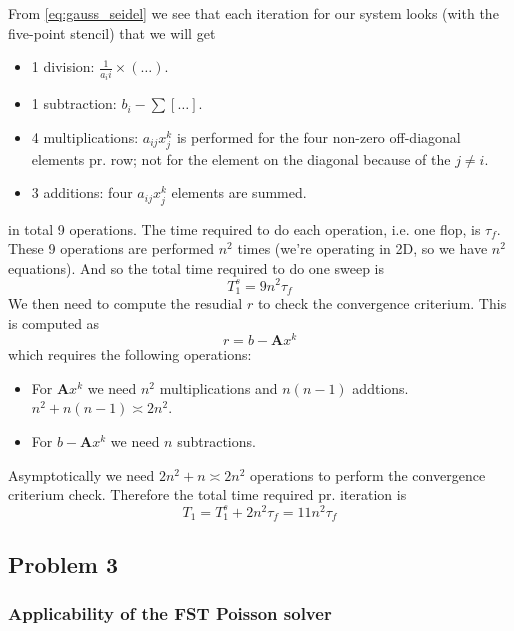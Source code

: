 From \eqref{eq:gauss_seidel} we see that each iteration for our system looks (with the five-point stencil) that we will get
\begin{itemize}
  \item 1 division: $\frac{1}{a_ii}\times(\dots)$.
  \item 1 subtraction: $b_i - \sum[\dots]$.
  \item 4 multiplications: $a_{ij}x_j^k$ is performed for the four non-zero off-diagonal elements pr. row; not for the element on the diagonal because of the $j\neq i$.
  \item 3 additions: four $a_{ij}x_j^k$ elements are summed.
\end{itemize}
in total 9 operations. The time required to do each operation, i.e. one flop, is $\tau_f$. These 9 operations are performed $n^2$ times (we're operating in 2D, so we have $n^2$ equations). And so the total time required to do one sweep is
\begin{equation}
  T_1^s = 9n^2\tau_f
\end{equation}
We then need to compute the resudial $r$ to check the convergence criterium. This is computed as
\begin{equation}
  r = b - \mathbf{A}x^k
\end{equation}
which requires the following operations:
\begin{itemize}
  \item For $\mathbf{A}x^k$ we need $n^2$ multiplications and $n(n-1)$ addtions. $n^2+n(n-1)\asymp 2n^2$.
  \item For $b - \mathbf{A}x^k$ we need $n$ subtractions.
\end{itemize}
Asymptotically we need $2n^2 + n \asymp 2n^2$ operations to perform the convergence criterium check. Therefore the total time required pr. iteration is
\begin{equation}
  T_1 = T_1^s + 2n^2 \tau_f = 11n^2 \tau_f
\end{equation}






\clearpage
\subsection{Problem 3} %
\label{sub:problem_3}

\subsubsection{Applicability of the FST Poisson solver} %
\label{ssub:applicability_of_fst}


